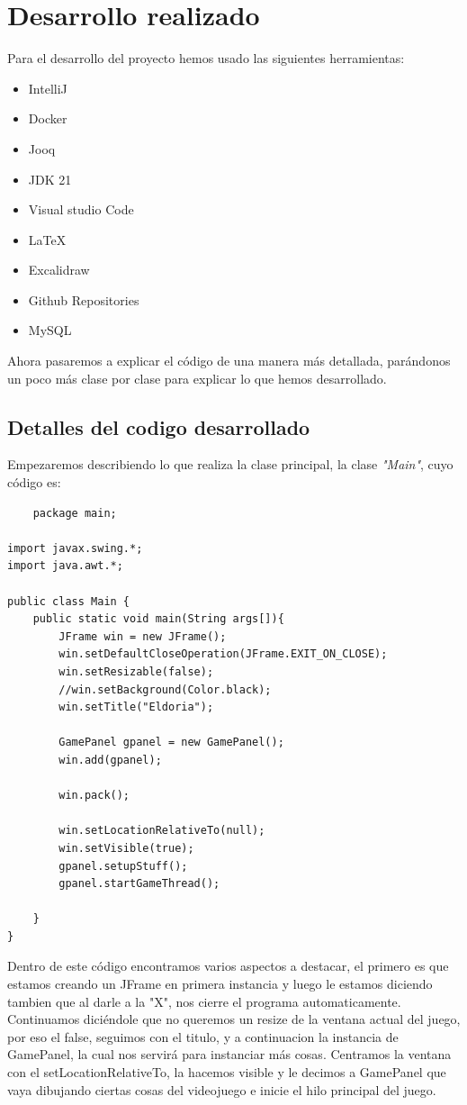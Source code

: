 \documentclass[a4paper]{article}
\begin{document}
\section{Desarrollo realizado}
Para el desarrollo del proyecto hemos usado las siguientes herramientas:
\begin{itemize}
    \item IntelliJ
    \item Docker
    \item Jooq
    \item JDK 21
    \item Visual studio Code
    \item \LaTeX
    \item Excalidraw
    \item Github Repositories
    \item MySQL
\end{itemize}
Ahora pasaremos a explicar el código de una manera más detallada, parándonos un poco más clase por clase para explicar lo que hemos desarrollado.
\subsection{Detalles del codigo desarrollado}
Empezaremos describiendo lo que realiza la clase principal, la clase \textit{"Main"}, cuyo código es:
\begin{lstlisting}
    package main;

import javax.swing.*;
import java.awt.*;

public class Main {
    public static void main(String args[]){
        JFrame win = new JFrame();
        win.setDefaultCloseOperation(JFrame.EXIT_ON_CLOSE);
        win.setResizable(false);
        //win.setBackground(Color.black);
        win.setTitle("Eldoria");

        GamePanel gpanel = new GamePanel();
        win.add(gpanel);

        win.pack();

        win.setLocationRelativeTo(null);
        win.setVisible(true);
        gpanel.setupStuff();
        gpanel.startGameThread();

    }
}
\end{lstlisting}
Dentro de este código encontramos varios aspectos a destacar, el primero es que estamos creando un JFrame en primera instancia y luego le estamos diciendo tambien que al darle a la "X", nos cierre el programa automaticamente.
Continuamos diciéndole que no queremos un resize de la ventana actual del juego, por eso el false, seguimos con el titulo, y a continuacion la instancia de GamePanel, la cual nos servirá para instanciar más cosas.
Centramos la ventana con el setLocationRelativeTo, la hacemos visible y le decimos a GamePanel que vaya dibujando ciertas cosas del videojuego e inicie el hilo principal del juego.\\
\end{document}

